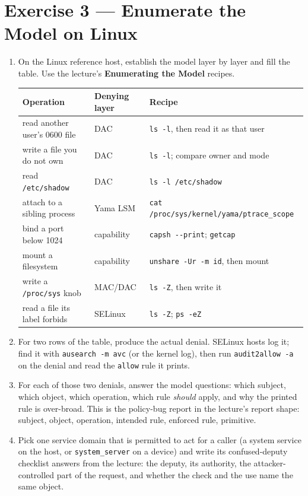 \documentclass[12pt]{Training}
\begin{document}
\section*{Exercise 3 --- Enumerate the Model on Linux}
\begin{enumerate}
    \item On the Linux reference host, establish the model layer by layer and fill the table. Use the lecture's \textbf{Enumerating the Model} recipes.
    \begin{center}
    \footnotesize
    \begin{tabular}{@{}p{4.2cm}p{3.2cm}p{6.6cm}@{}}
    \toprule
    \textbf{Operation} & \textbf{Denying layer} & \textbf{Recipe} \\
    \midrule
    read another user's 0600 file & DAC & \lstinline|ls -l|, then read it as that user \\
    write a file you do not own & DAC & \lstinline|ls -l|; compare owner and mode \\
    read \lstinline|/etc/shadow| & DAC & \lstinline|ls -l /etc/shadow| \\
    attach to a sibling process & Yama LSM & \lstinline|cat /proc/sys/kernel/yama/ptrace_scope| \\
    bind a port below 1024 & capability & \lstinline|capsh --print|; \lstinline|getcap| \\
    mount a filesystem & capability & \lstinline|unshare -Ur -m id|, then mount \\
    write a \lstinline|/proc/sys| knob & MAC/DAC & \lstinline|ls -Z|, then write it \\
    read a file its label forbids & SELinux & \lstinline|ls -Z|; \lstinline|ps -eZ| \\
    \bottomrule
    \end{tabular}
    \end{center}
    \item For two rows of the table, produce the actual denial. SELinux hosts log it; find it with \lstinline{ausearch -m avc} (or the kernel log), then run \lstinline{audit2allow -a} on the denial and read the \lstinline{allow} rule it prints.
    \item For each of those two denials, answer the model questions: which subject, which object, which operation, which rule \emph{should} apply, and why the printed rule is over-broad. This is the policy-bug report in the lecture's report shape: subject, object, operation, intended rule, enforced rule, primitive.
    \item Pick one service domain that is permitted to act for a caller (a system service on the host, or \lstinline{system_server} on a device) and write its confused-deputy checklist answers from the lecture: the deputy, its authority, the attacker-controlled part of the request, and whether the check and the use name the same object.
\end{enumerate}
\end{document}
